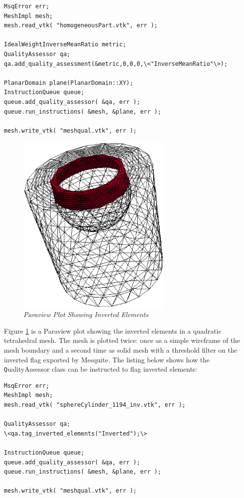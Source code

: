 \newpage
\begin{samepage}
\begin{lstlisting}[frame=single]
MsqError err;
MeshImpl mesh;
mesh.read_vtk( "homogeneousPart.vtk", err );

IdealWeightInverseMeanRatio metric;
QualityAssessor qa;
qa.add_quality_assessment(&metric,0,0,0,\<"InverseMeanRatio"\>);

PlanarDomain plane(PlanarDomain::XY);
InstructionQueue queue;
queue.add_quality_assessor( &qa, err );
queue.run_instructions( &mesh, &plane, err );

mesh.write_vtk( "meshqual.vtk", err );
\end{lstlisting}
\end{samepage}

\begin{figure}[htb!]
\begin{center}
\includegraphics[width=3in]{meshqual3d}
\caption{\em Paraview Plot Showing Inverted Elements \label{fig:meshqual3d}}
\end{center}
\end{figure}

Figure \ref{fig:meshqual3d} is a Paraview plot showing the inverted elements in a quadratic tetrahedral mesh.  The mesh is plotted twice: once as a simple wireframe of the mesh boundary and a second time as solid mesh with a threshold filter on the inverted flag exported by Mesquite.  The listing below shows how the {\texttt QualityAssessor} class can be instructed to flag inverted elements:

\newpage
\begin{lstlisting}[frame=single]
MsqError err;
MeshImpl mesh;
mesh.read_vtk( "sphereCylinder_1194_inv.vtk", err );

QualityAssessor qa;
\<qa.tag_inverted_elements("Inverted");\>

InstructionQueue queue;
queue.add_quality_assessor( &qa, err );
queue.run_instructions( &mesh, &plane, err );

mesh.write_vtk( "meshqual.vtk", err );
\end{lstlisting}



